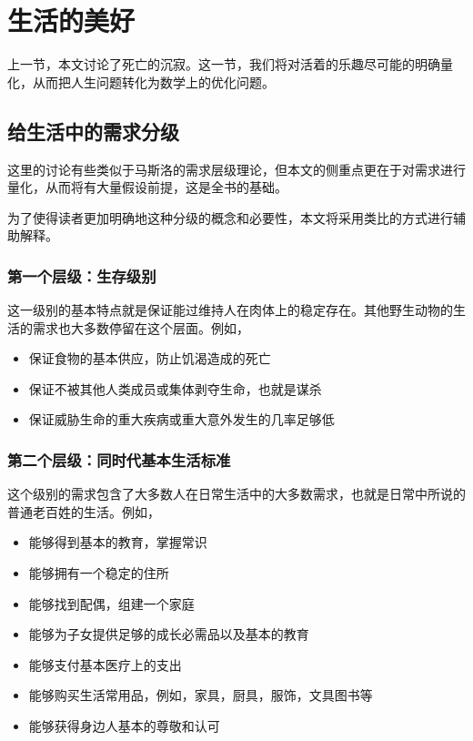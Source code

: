 \section{生活的美好}

上一节，本文讨论了死亡的沉寂。这一节，我们将对活着的乐趣尽可能的明确量化，从而把人生问题转化为数学上的优化问题。

\subsection{给生活中的需求分级}

这里的讨论有些类似于马斯洛的需求层级理论，但本文的侧重点更在于对需求进行量化，从而将有大量假设前提，这是全书的基础。

为了使得读者更加明确地这种分级的概念和必要性，本文将采用类比的方式进行辅助解释。

\subsubsection*{第一个层级：生存级别}

这一级别的基本特点就是保证能过维持人在肉体上的稳定存在。其他野生动物的生活的需求也大多数停留在这个层面。例如，

\begin{itemize}
    \item 保证食物的基本供应，防止饥渴造成的死亡
    \item 保证不被其他人类成员或集体剥夺生命，也就是谋杀
    \item 保证威胁生命的重大疾病或重大意外发生的几率足够低
\end{itemize}

\subsubsection*{第二个层级：同时代基本生活标准}

这个级别的需求包含了大多数人在日常生活中的大多数需求，也就是日常中所说的普通老百姓的生活。例如，

\begin{itemize}
    \item 能够得到基本的教育，掌握常识
    \item 能够拥有一个稳定的住所
    \item 能够找到配偶，组建一个家庭
    \item 能够为子女提供足够的成长必需品以及基本的教育
    \item 能够支付基本医疗上的支出
    \item 能够购买生活常用品，例如，家具，厨具，服饰，文具图书等
    \item 能够获得身边人基本的尊敬和认可
\end{itemize}

